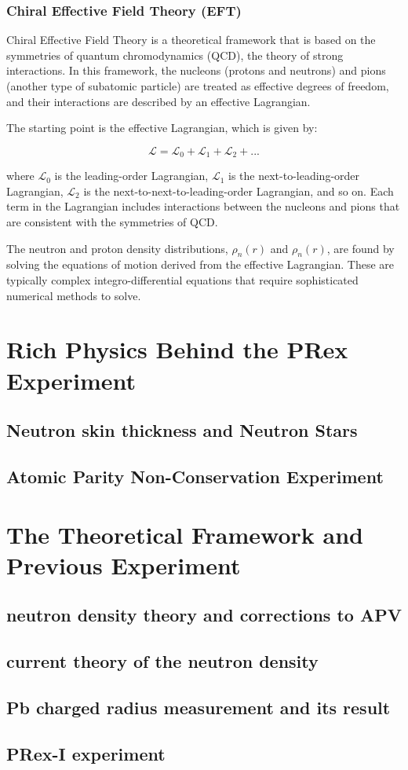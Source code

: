 \subsubsection{Chiral Effective Field Theory (EFT)}

Chiral Effective Field Theory is a theoretical framework that is based on the symmetries of quantum chromodynamics (QCD), the theory of strong interactions. In this framework, the nucleons (protons and neutrons) and pions (another type of subatomic particle) are treated as effective degrees of freedom, and their interactions are described by an effective Lagrangian.

The starting point is the effective Lagrangian, which is given by:

\begin{equation}
    \mathcal{L} =\mathcal{L}_0 + \mathcal{L}_1 + \mathcal{L}_2 + ...
\end{equation}

where $\mathcal{L}_0$ is the leading-order Lagrangian, $\mathcal{L}_1$ is the next-to-leading-order Lagrangian, $\mathcal{L}_2$ is the next-to-next-to-leading-order Lagrangian, and so on. Each term in the Lagrangian includes interactions between the nucleons and pions that are consistent with the symmetries of QCD.

The neutron and proton density distributions, $\rho_n(r)$ and $\rho_n(r)$, are found by solving the equations of motion derived from the effective Lagrangian. These are typically complex integro-differential equations that require sophisticated numerical methods to solve.

\section{Rich Physics Behind the PRex Experiment}

\subsection{Neutron skin thickness and Neutron Stars}

\subsection{Atomic Parity Non-Conservation Experiment}

\section{The Theoretical Framework and Previous Experiment}

\subsection{neutron density theory and corrections to APV}

\subsection{current theory of the neutron density}

\subsection{Pb charged radius measurement and its result }

\subsection{PRex-I experiment}